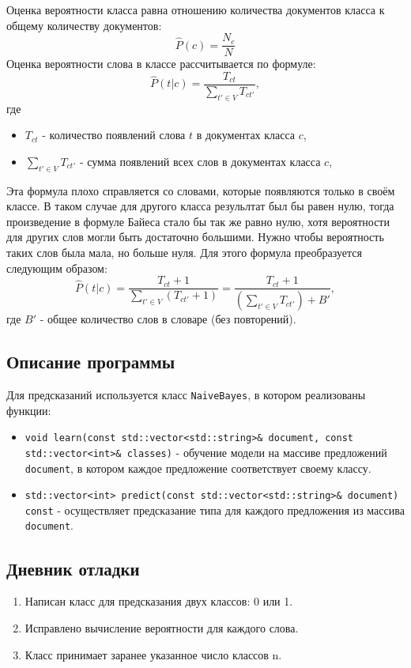 \documentclass[12pt]{article}
\begin{document}
Оценка вероятности класса равна отношению количества документов класса к общему количеству документов:
$$\widehat{P}(c) = \frac {N_c} {N}$$
Оценка вероятности слова в классе рассчитывается по формуле:
$$\widehat{P}(t | c) = \frac {T_{ct}} {\sum_{t' \in V} T_{ct'}} ,$$
где 
\begin{itemize}
    \item $T_{ct}$ - количество появлений слова $t$ в документах класса $c$,
    \item $\sum_{t' \in V} T_{ct'}$ - сумма появлений всех слов в документах класса $c$,
\end{itemize}
Эта формула плохо справляется со словами, которые появляются только в своём классе.
В таком случае для другого класса резульлтат был бы равен нулю, тогда произведение
в формуле Байеса стало бы так же равно нулю, хотя вероятности для других слов могли быть 
достаточно большими. Нужно чтобы вероятность таких слов была мала, но больше нуля.
Для этого формула преобразуется следующим образом:
$$\widehat{P}(t | c) = \frac {T_{ct} + 1} {\sum_{t' \in V} (T_{ct'} + 1)} =
\frac {T_{ct} + 1} {(\sum_{t' \in V} T_{ct'}) + B'} ,$$
где $B'$ - общее количество слов в словаре (без повторений).



\subsection*{Описание программы}

Для предсказаний используется класс \texttt{NaiveBayes}, в котором реализованы функции:
\begin{itemize}
    \item \texttt{void learn(const std::vector<std::string>\& document, const std::vector<int>\& classes)} - 
          обучение модели на массиве предложений \texttt{document}, в котором каждое предложение соответствует своему классу.
    \item \texttt{std::vector<int> predict(const std::vector<std::string>\& document) const} -
          осуществляет предсказание типа для каждого предложения из массива \texttt{document}.
\end{itemize}

\subsection*{Дневник отладки}

\begin{enumerate}
    \item Написан класс для предсказания двух классов: 0 или 1.
    \item Исправлено вычисление вероятности для каждого слова.
    \item Класс принимает заранее указанное число классов n.
\end{enumerate}
\end{document}
